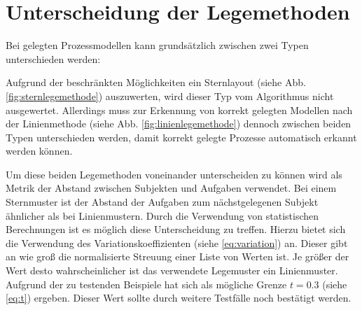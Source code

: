 \section{Unterscheidung der Legemethoden} %
\label{sub:unterscheidung_der_legemethoden}
Bei gelegten Prozessmodellen kann grundsätzlich zwischen zwei Typen unterschieden werden: 

Aufgrund der beschränkten Möglichkeiten ein Sternlayout (siehe Abb. \ref{fig:sternlegemethode}) auszuwerten, wird dieser Typ vom Algorithmus nicht ausgewertet. Allerdings muss zur Erkennung von korrekt gelegten Modellen nach der Linienmethode (siehe Abb. \ref{fig:linienlegemethode}) dennoch zwischen beiden Typen unterschieden werden, damit korrekt gelegte Prozesse automatisch erkannt werden können.

Um diese beiden Legemethoden voneinander unterscheiden zu können wird als Metrik der Abstand zwischen Subjekten und Aufgaben verwendet. Bei einem Sternmuster ist der Abstand der Aufgaben zum nächstgelegenen Subjekt ähnlicher als bei Linienmustern. Durch die Verwendung von statistischen Berechnungen ist es möglich diese Unterscheidung zu treffen. Hierzu bietet sich die Verwendung des Variationskoeffizienten (siehe \ref{eq:variation}) an. Dieser gibt an wie groß die normalisierte Streuung einer Liste von Werten ist. Je größer der Wert desto wahrscheinlicher ist das verwendete Legemuster ein Linienmuster. Aufgrund der zu testenden Beispiele hat sich als mögliche Grenze $t=0.3$ (siehe \ref{eq:t}) ergeben. Dieser Wert sollte durch weitere Testfälle noch bestätigt werden.

